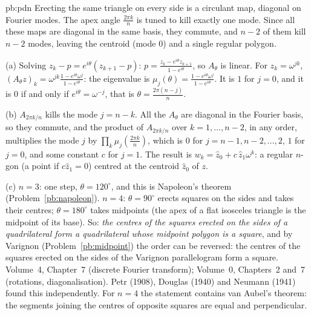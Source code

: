 \begin{solution}{pb:pdn}
\idea Erecting the same triangle on every side is a circulant map, diagonal on Fourier modes. The apex angle $\frac{2\pi k}n$
is tuned to kill exactly one mode. Since all these maps are diagonal in the same basis, they commute, and $n-2$ of them kill
$n-2$ modes, leaving the centroid (mode $0$) and a single regular polygon.

\writeup (a) Solving $z_k-p=e^{i\theta}(z_{k+1}-p)$: $p=\frac{z_k-e^{i\theta}z_{k+1}}{1-e^{i\theta}}$, so $A_\theta$ is linear. For
$z_k=\omega^{jk}$, $(A_\theta z)_k=\omega^{jk}\frac{1-e^{i\theta}\omega^j}{1-e^{i\theta}}$: the eigenvalue is
$\mu_j(\theta)=\frac{1-e^{i\theta}\omega^j}{1-e^{i\theta}}$. It is $1$ for $j=0$, and it is $0$ if and only if
$e^{i\theta}=\omega^{-j}$, that is $\theta=\frac{2\pi(n-j)}n$.

(b) $A_{2\pi k/n}$ kills the mode $j=n-k$. All the $A_\theta$ are diagonal in the Fourier basis, so they commute, and the
product of $A_{2\pi k/n}$ over $k=1,\dots,n-2$, in any order, multiplies the mode $j$ by $\prod_k\mu_j(\frac{2\pi k}n)$, which is
$0$ for $j=n-1,n-2,\dots,2$, $1$ for $j=0$, and some constant $c$ for $j=1$. The result is
$w_k=\hat z_0+c\,\hat z_1\omega^k$: a regular $n$-gon (a point if $c\hat z_1=0$) centred at the centroid $\hat z_0$ of $z$.

(c) $n=3$: one step, $\theta=120^\circ$, and this is Napoleon's theorem (Problem~\ref{pb:napoleon}). $n=4$: $\theta=90^\circ$ erects
squares on the sides and takes their centres; $\theta=180^\circ$ takes midpoints (the apex of a flat isosceles triangle is the
midpoint of its base). So: \emph{the centres of the squares erected on the sides of a quadrilateral form a quadrilateral whose
midpoint polygon is a square}, and by Varignon (Problem~\ref{pb:midpoint}) the order can be reversed: the centres of the
squares erected on the sides of the Varignon parallelogram form a square.
\tools Volume~4, Chapter~7 (discrete Fourier transform); Volume~0, Chapters~2 and~7 (rotations, diagonalisation).
\leads Petr (1908), Douglas (1940) and Neumann (1941) found this independently. For $n=4$ the statement contains van Aubel's
theorem: the segments joining the centres of opposite squares are equal and perpendicular.
\end{solution}

